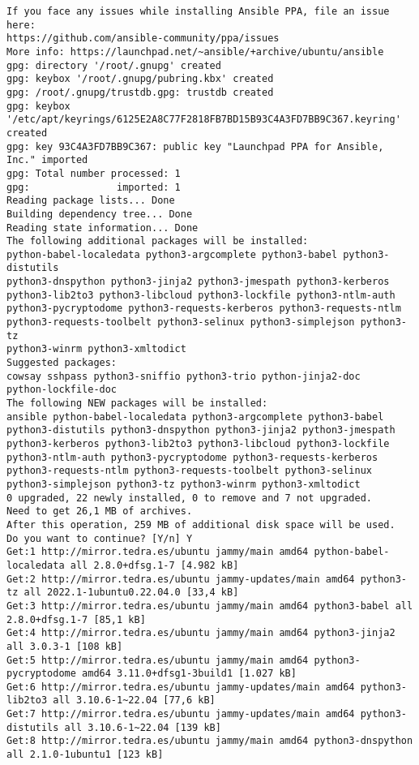 \documentclass[../main.tex]{subfiles}
\begin{document}
\begin{lstlisting}
If you face any issues while installing Ansible PPA, file an issue here:
https://github.com/ansible-community/ppa/issues
More info: https://launchpad.net/~ansible/+archive/ubuntu/ansible
gpg: directory '/root/.gnupg' created
gpg: keybox '/root/.gnupg/pubring.kbx' created
gpg: /root/.gnupg/trustdb.gpg: trustdb created
gpg: keybox '/etc/apt/keyrings/6125E2A8C77F2818FB7BD15B93C4A3FD7BB9C367.keyring' created
gpg: key 93C4A3FD7BB9C367: public key "Launchpad PPA for Ansible, Inc." imported
gpg: Total number processed: 1
gpg:               imported: 1
Reading package lists... Done
Building dependency tree... Done
Reading state information... Done
The following additional packages will be installed:
python-babel-localedata python3-argcomplete python3-babel python3-distutils
python3-dnspython python3-jinja2 python3-jmespath python3-kerberos
python3-lib2to3 python3-libcloud python3-lockfile python3-ntlm-auth
python3-pycryptodome python3-requests-kerberos python3-requests-ntlm
python3-requests-toolbelt python3-selinux python3-simplejson python3-tz
python3-winrm python3-xmltodict
Suggested packages:
cowsay sshpass python3-sniffio python3-trio python-jinja2-doc
python-lockfile-doc
The following NEW packages will be installed:
ansible python-babel-localedata python3-argcomplete python3-babel
python3-distutils python3-dnspython python3-jinja2 python3-jmespath
python3-kerberos python3-lib2to3 python3-libcloud python3-lockfile
python3-ntlm-auth python3-pycryptodome python3-requests-kerberos
python3-requests-ntlm python3-requests-toolbelt python3-selinux
python3-simplejson python3-tz python3-winrm python3-xmltodict
0 upgraded, 22 newly installed, 0 to remove and 7 not upgraded.
Need to get 26,1 MB of archives.
After this operation, 259 MB of additional disk space will be used.
Do you want to continue? [Y/n] Y
Get:1 http://mirror.tedra.es/ubuntu jammy/main amd64 python-babel-localedata all 2.8.0+dfsg.1-7 [4.982 kB]
Get:2 http://mirror.tedra.es/ubuntu jammy-updates/main amd64 python3-tz all 2022.1-1ubuntu0.22.04.0 [33,4 kB]
Get:3 http://mirror.tedra.es/ubuntu jammy/main amd64 python3-babel all 2.8.0+dfsg.1-7 [85,1 kB]
Get:4 http://mirror.tedra.es/ubuntu jammy/main amd64 python3-jinja2 all 3.0.3-1 [108 kB]
Get:5 http://mirror.tedra.es/ubuntu jammy/main amd64 python3-pycryptodome amd64 3.11.0+dfsg1-3build1 [1.027 kB]
Get:6 http://mirror.tedra.es/ubuntu jammy-updates/main amd64 python3-lib2to3 all 3.10.6-1~22.04 [77,6 kB]
Get:7 http://mirror.tedra.es/ubuntu jammy-updates/main amd64 python3-distutils all 3.10.6-1~22.04 [139 kB]
Get:8 http://mirror.tedra.es/ubuntu jammy/main amd64 python3-dnspython all 2.1.0-1ubuntu1 [123 kB]

\end{lstlisting}
\end{document}
